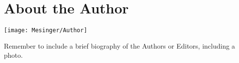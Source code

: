 \chapter*{About the Author}


\texttt{[image: Mesinger/Author]}

Remember to include a brief biography of the Authors or Editors, including a photo.
